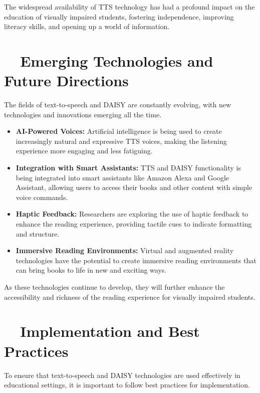 The widespread availability of TTS technology has had a profound impact on the education of visually impaired students, fostering independence, improving literacy skills, and opening up a world of information.\supercite{Kelly2011, Holbrook2006}

\section{~~Emerging Technologies and Future Directions}

The fields of text-to-speech and DAISY are constantly evolving, with new technologies and innovations emerging all the time.\supercite{aimodels2024}

\begin{itemize}
	\item \textbf{AI-Powered Voices:} Artificial intelligence is being used to create increasingly natural and expressive TTS voices, making the listening experience more engaging and less fatiguing.
	\item \textbf{Integration with Smart Assistants:} TTS and DAISY functionality is being integrated into smart assistants like Amazon Alexa and Google Assistant, allowing users to access their books and other content with simple voice commands.
	\item \textbf{Haptic Feedback:} Researchers are exploring the use of haptic feedback to enhance the reading experience, providing tactile cues to indicate formatting and structure.
	\item \textbf{Immersive Reading Environments:} Virtual and augmented reality technologies have the potential to create immersive reading environments that can bring books to life in new and exciting ways.
\end{itemize}

As these technologies continue to develop, they will further enhance the accessibility and richness of the reading experience for visually impaired students.

\section{~~Implementation and Best Practices}

To ensure that text-to-speech and DAISY technologies are used effectively in educational settings, it is important to follow best practices for implementation.\supercite{Burgstahler2015}

